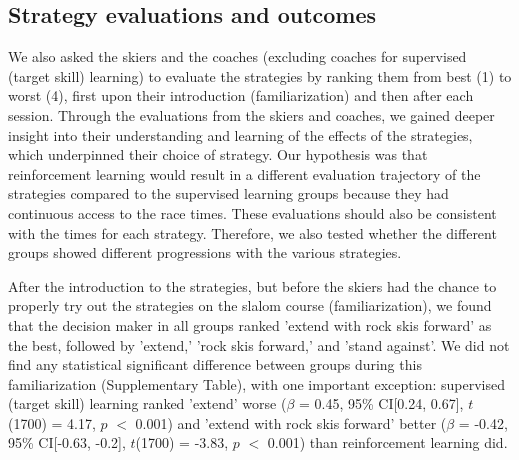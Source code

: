 \documentclass[pdflatex,sn-mathphys-num]{sn-jnl}%
\theoremstyle{thmstyleone}%
\theoremstyle{thmstyletwo}%
\theoremstyle{thmstylethree}%
\begin{document}
\subsection{Strategy evaluations and outcomes}
We also asked the skiers and the coaches (excluding coaches for supervised (target skill) learning) to evaluate the strategies by ranking them from best (1) to worst (4), first upon their introduction (familiarization) and then after each session. Through the evaluations from the skiers and coaches, we gained deeper insight into their understanding and learning of the effects of the strategies, which underpinned their choice of strategy. Our hypothesis was that reinforcement learning would result in a different evaluation trajectory of the strategies compared to the supervised learning groups because they had continuous access to the race times. These evaluations should also be consistent with the times for each strategy. Therefore, we also tested whether the different groups showed different progressions with the various strategies.

After the introduction to the strategies, but before the skiers had the chance to properly try out the strategies on the slalom course (familiarization), we found that the decision maker in all groups ranked 'extend with rock skis forward' as the best, followed by 'extend,' 'rock skis forward,' and 'stand against'. We did not find any statistical significant difference between groups during this familiarization (Supplementary Table), with one important exception: supervised (target skill) learning ranked 'extend' worse ($\beta$ = 0.45, 95\% CI[0.24,  0.67], $t$(1700) = 4.17, $p$ $<$ 0.001) and 'extend with rock skis forward' better  ($\beta$ = -0.42, 95\% CI[-0.63, -0.2], $t$(1700) = -3.83, $p$ $<$ 0.001) than reinforcement learning did.
\end{document}
